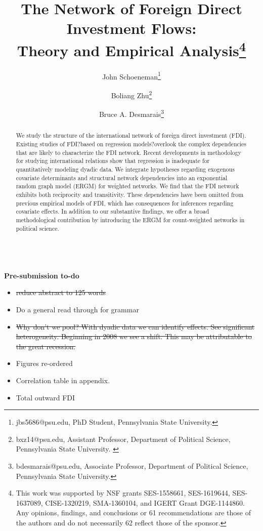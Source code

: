 \documentclass[reqno,onecolumn,letterpaper,12pt]{article}
\begin{document}
\title{The Network of Foreign Direct Investment Flows: \\Theory and Empirical Analysis\footnote{This work was supported by NSF grants SES-1558661, SES-1619644, SES-1637089, CISE-1320219, SMA-1360104, and IGERT Grant DGE-1144860. Any opinions, findings, and conclusions or 61 recommendations are those of the authors and do not necessarily 62 reflect those of the sponsor.}}
\author{John  Schoeneman\thanks{\footnotesize{
jbs5686@psu.edu, PhD Student, Pennsylvania State University.}} \and Boliang Zhu\thanks{\footnotesize{bxz14@psu.edu, Assistant Professor, Department of Political Science, Pennsylvania State University. }} \and Bruce A. Desmarais\thanks{\footnotesize{
bdesmarais@psu.edu, Associate Professor, Department of Political Science, Pennsylvania State University.}}}
\date{}
\maketitle

\thispagestyle{empty}
\singlespacing
\begin{abstract}
    \noindent We study the structure of the international network of foreign direct investment (FDI). Existing studies of FDI?based on regression models?overlook the complex dependencies that are likely to characterize the FDI network. Recent developments in methodology for studying international relations show that regression is inadequate for quantitatively modeling dyadic data. We integrate hypotheses regarding exogenous covariate determinants and structural network dependencies into an exponential random graph model (ERGM) for weighted networks. We find that the FDI network exhibits both reciprocity and transitivity. These dependencies have been omitted from previous empirical models of FDI, which has consequences for inferences regarding covariate effects. In addition to our substantive findings, we offer a broad methodological contribution by introducing the ERGM for count-weighted networks in political science. 

\end{abstract}
~\\

{\bf Pre-submission to-do}
\begin{itemize}
\item \st{reduce abstract to 125 words}
\item Do a general read through for grammar
\item \st{Why don't we pool? With dyadic data we can identify effects. See significant heterogeneity. Beginning in 2008 we see a shift. This may be attributable to the great recession.}
\item Figures re-ordered
\item Correlation table in appendix. 
\item Total outward FDI

\end{itemize}
\end{document}
